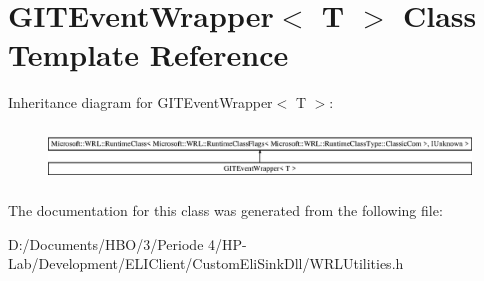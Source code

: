\hypertarget{class_g_i_t_event_wrapper}{}\section{G\+I\+T\+Event\+Wrapper$<$ T $>$ Class Template Reference}
\label{class_g_i_t_event_wrapper}
Inheritance diagram for G\+I\+T\+Event\+Wrapper$<$ T $>$\+:\begin{figure}[H]
\begin{center}
\leavevmode
\includegraphics[height=1.473684cm]{d4/d2b/class_g_i_t_event_wrapper}
\end{center}
\end{figure}


The documentation for this class was generated from the following file\+:\begin{DoxyCompactItemize}
\item 
D\+:/\+Documents/\+H\+B\+O/3/\+Periode 4/\+H\+P-\/\+Lab/\+Development/\+E\+L\+I\+Client/\+Custom\+Eli\+Sink\+Dll/W\+R\+L\+Utilities.\+h\end{DoxyCompactItemize}
